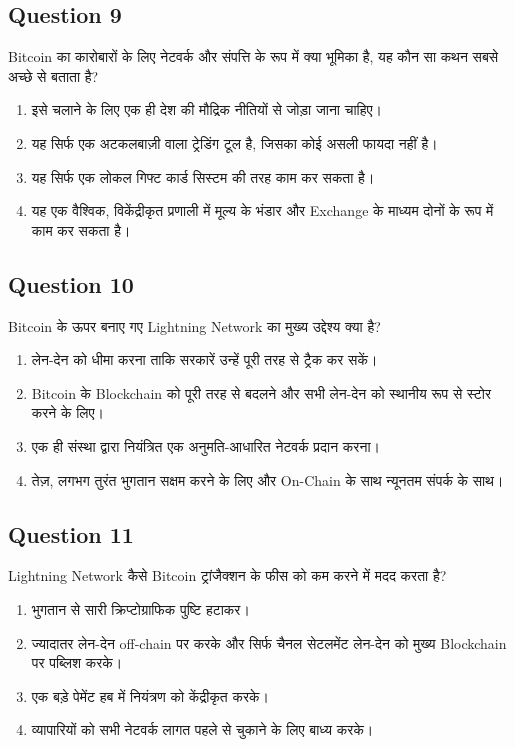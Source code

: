 \documentclass[12pt,a4paper]{article}
\begin{document}
\bigskip


\subsection*{Question 9}
Bitcoin का कारोबारों के लिए नेटवर्क और संपत्ति के रूप में क्या भूमिका है, यह कौन सा कथन सबसे अच्छे से बताता है?

\begin{enumerate}[label=\Alph*., leftmargin=*]
\item इसे चलाने के लिए एक ही देश की मौद्रिक नीतियों से जोड़ा जाना चाहिए।
\item यह सिर्फ एक अटकलबाज़ी वाला ट्रेडिंग टूल है, जिसका कोई असली फायदा नहीं है।
\item यह सिर्फ एक लोकल गिफ्ट कार्ड सिस्टम की तरह काम कर सकता है।
\item यह एक वैश्विक, विकेंद्रीकृत प्रणाली में मूल्य के भंडार और Exchange के माध्यम दोनों के रूप में काम कर सकता है।
\end{enumerate}

\bigskip


\subsection*{Question 10}
Bitcoin के ऊपर बनाए गए Lightning Network का मुख्य उद्देश्य क्या है?

\begin{enumerate}[label=\Alph*., leftmargin=*]
\item लेन-देन को धीमा करना ताकि सरकारें उन्हें पूरी तरह से ट्रैक कर सकें।
\item Bitcoin के Blockchain को पूरी तरह से बदलने और सभी लेन-देन को स्थानीय रूप से स्टोर करने के लिए।
\item एक ही संस्था द्वारा नियंत्रित एक अनुमति-आधारित नेटवर्क प्रदान करना।
\item तेज़, लगभग तुरंत भुगतान सक्षम करने के लिए और On-Chain के साथ न्यूनतम संपर्क के साथ।
\end{enumerate}

\bigskip


\subsection*{Question 11}
Lightning Network कैसे Bitcoin ट्रांजैक्शन के फीस को कम करने में मदद करता है?

\begin{enumerate}[label=\Alph*., leftmargin=*]
\item भुगतान से सारी क्रिप्टोग्राफिक पुष्टि हटाकर।
\item ज्यादातर लेन-देन off-chain पर करके और सिर्फ चैनल सेटलमेंट लेन-देन को मुख्य Blockchain पर पब्लिश करके।
\item एक बड़े पेमेंट हब में नियंत्रण को केंद्रीकृत करके।
\item व्यापारियों को सभी नेटवर्क लागत पहले से चुकाने के लिए बाध्य करके।
\end{enumerate}
\end{document}
